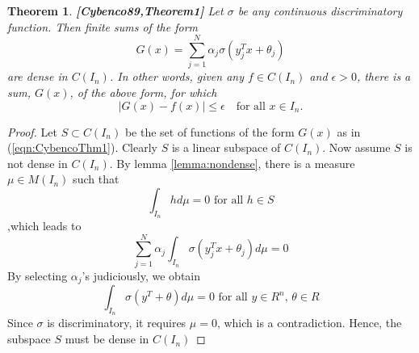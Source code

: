 \documentclass[12pt]{amsart}
\theoremstyle{plain}
\newtheorem{thm}{Theorem}[section]
\theoremstyle{definition}
\theoremstyle{remark}
\numberwithin{equation}{section}
\numberwithin{thm}{section}
\begin{document}
\begin{thm}\label{CybencoThm1}
\textbf{[Cybenco89,Theorem1]}
    Let $\sigma$ be any continuous discriminatory function. Then finite sums of the form
    \begin{equation}\label{eqn:CybencoThm1}
        G(x) = \sum_{j=1}^N \alpha_j \sigma(y_j^T x + \theta_j) 
    \end{equation}
    are dense in $C(I_n)$. In other words, given any $f \in C(I_n)$ and $\epsilon > 0$, there is a sum, $G(x)$, of the above form, for which
    \begin{equation*}
        |G(x)-f(x)| \leq \epsilon \quad \text{for all } x \in I_n.
    \end{equation*}
\end{thm}
\begin{proof}
    Let $S \subset C(I_n)$ be the set of functions of the form $G(x)$ as in (\ref{eqn:CybencoThm1}). Clearly $S$ is a linear subspace of $C(I_n)$. Now assume $S$ is not dense in $C(I_n)$. By lemma \ref{lemma:nondense}, there is a measure $\mu \in M(I_n)$ such that \begin{equation*}
        \int_{I_n} hd\mu = 0 \text{ for all } h \in S
    \end{equation*}
    ,which leads to 
    \begin{equation*}
       \sum_{j=1}^N \alpha_j \int_{I_n} \sigma(y_j^T x + \theta_j)d\mu =0 
    \end{equation*}
    By selecting $\alpha_j$'s judiciously, we obtain 
    \begin{equation*}
        \int_{I_n}\sigma(y^T+\theta)d\mu =0 \text{ for all } y \in R^n \text{, } \theta \in R 
    \end{equation*}
    Since $\sigma$ is discriminatory, it requires $\mu=0$, which is a contradiction. Hence, the subspace $S$ must be dense in $C(I_n)$
 
\end{proof}
\end{document}
